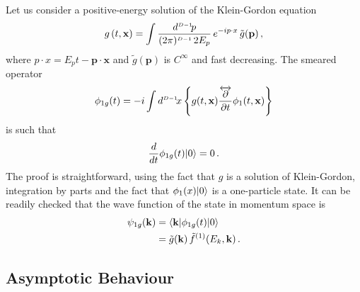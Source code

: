 Let us consider a positive-energy solution of the Klein-Gordon equation
\begin{equation}
    \label{eq:KGSolution}
    g\left(t,\mathbf{x}\right) = 
        \int \frac{d^{\scriptscriptstyle{D-1}}\!p}{(2\pi)^{\scriptscriptstyle{D-1}}\, 2E_p}\,
        e^{-ip\cdot x}\, \tilde{g}(\mathbf{p})\, ,
\end{equation}
where $p\cdot x = E_p t - \mathbf{p}\cdot\mathbf{x}$ and $\tilde{g}(\mathbf{p})$ is 
$C^\infty$ and fast decreasing. The smeared operator
\begin{equation}
    \label{eq:Phi1gDef}
    \phi_{1g}(t) = -i 
        \int d^{\scriptscriptstyle{D-1}}\!x \left\{ g(t,\mathbf{x}) 
        \frac{\overleftrightarrow{\partial}}{\partial t} \phi_1(t,\mathbf{x})\right\} 
\end{equation}
is such that 
\begin{equation}
    \label{eq:TimeIndepOnePartState}
    \frac{d}{dt} \phi_{1g}(t) | 0 \rangle = 0\, .
\end{equation}
The proof is straightforward, using the fact that $g$ is a solution of Klein-Gordon, 
integration by parts and the fact that $\phi_1(x) | 0 \rangle$ is a one-particle state. 
It can be readily checked that the wave function of the state in momentum space is 
\begin{equation}
    \label{eq:MomentumWaveFuncState}
    \begin{split}
        \psi_{1g}(\mathbf{k}) 
            &= \langle \mathbf{k} | \phi_{1g}(t) | 0 \rangle \\
            &= \tilde{g}(\mathbf{k})\, \tilde{f}^{(1)}(E_k,\mathbf{k})\, .
    \end{split}
\end{equation}

\subsection{Asymptotic Behaviour}
\label{sec:AsympTimeBehaviour}

